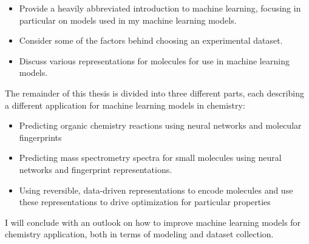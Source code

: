 \begin{itemize}
\item Provide a heavily abbreviated introduction to machine learning, focusing in particular on models used in my machine learning models.
\item Consider some of the factors behind choosing an experimental dataset.
\item Discuss various representations for molecules for use in machine learning models.
\end{itemize}
The remainder of this thesis is divided into three different parts, each describing a different application for machine learning models in chemistry: 
\begin{itemize}
\item Predicting organic chemistry reactions using neural networks and molecular fingerprints
\item Predicting mass spectrometry spectra for small molecules using neural networks and fingerprint representations.
\item Using reversible, data-driven representations to encode molecules and use these representations to drive optimization for particular properties
\end{itemize}
I will conclude with an outlook on how to improve machine learning models for chemistry application, both in terms of modeling and dataset collection.

